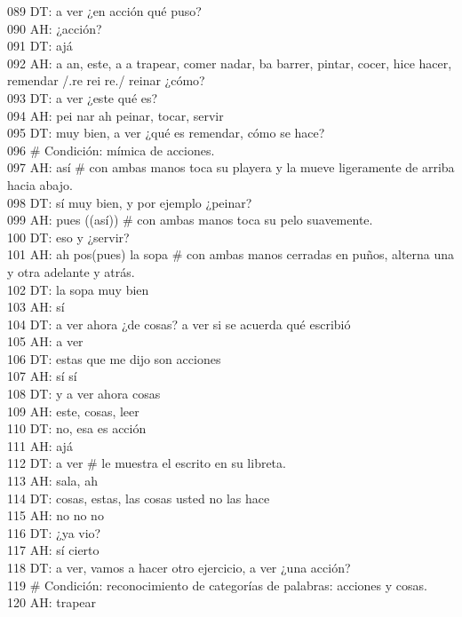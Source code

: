 089 DT: a ver ¿en acción qué puso?\\
090 AH: ¿acción?\\
091 DT: ajá\\
092 AH: a an, este, a a trapear, comer nadar, ba barrer, pintar, cocer, hice hacer, remendar /.re rei re./ reinar ¿cómo?\\
093 DT: a ver ¿este qué es?\\
094 AH: pei nar ah peinar, tocar, servir\\
095 DT: muy bien, a ver ¿qué es remendar, cómo se hace?\\
096 \# Condición: mímica de acciones.\\
097 AH: así \# con ambas manos toca su playera y la mueve ligeramente de arriba hacia abajo.\\
098 DT: sí muy bien, y por ejemplo  ¿peinar?\\
099 AH: pues ((así)) \# con ambas manos toca su pelo suavemente.\\
100 DT: eso y ¿servir?\\
101 AH: ah pos(pues) la sopa \# con ambas manos cerradas en puños, alterna una y otra adelante y atrás.\\
102 DT: la sopa muy bien\\
103 AH: sí\\
104 DT: a ver ahora ¿de cosas? a ver si se acuerda qué escribió\\
105 AH: a ver\\
106 DT: estas que me dijo son acciones\\
107 AH: sí sí\\
108 DT: y a ver ahora cosas\\
109 AH: este, cosas, leer\\
110 DT: no, esa es acción\\
111 AH: ajá\\
112 DT: a ver \# le muestra el escrito en su libreta.\\
113 AH: sala, ah\\
114 DT: cosas, estas, las cosas usted no las hace\\
115 AH: no no no\\
116 DT: ¿ya vio?\\
117 AH: sí cierto\\
118 DT: a ver, vamos a hacer otro ejercicio, a ver ¿una acción?\\
119 \# Condición: reconocimiento de categorías de palabras: acciones y cosas.\\
120 AH: trapear\\
